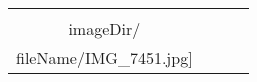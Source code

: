 \begin{table}
\begin{tabular}{cccc}
\texttt{[image: \\imageDir/\\fileName/IMG\_7451.jpg]} \\
\end{tabular}
\end{table}
